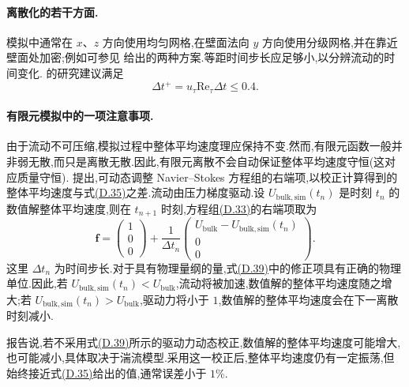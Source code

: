 \begin{example}[湍流槽道流]
\paragraph{离散化的若干方面.}
模拟中通常在 $x$、$z$ 方向使用均匀网格,在壁面法向 $y$ 方向使用分级网格,并在靠近壁面处加密;例如可参见\textcite{Gravemeier2006a,Gravemeier2006b} 给出的两种方案.等距时间步长应足够小,以分辨流动的时间变化.\textcite{ChoiMoin1994} 的研究建议满足
\begin{equation}\label{eq:appendix-d-38}
\Delta t^+=u_\tau\mathrm{Re}_\tau\Delta t\le0.4.
\end{equation}

\paragraph{有限元模拟中的一项注意事项.}
由于流动不可压缩,模拟过程中整体平均速度理应保持不变.然而,有限元函数一般并非弱无散,而只是离散无散.因此,有限元离散不会自动保证整体平均速度守恒(这对应质量守恒).\textcite{JohnRoland2007} 提出,可动态调整 Navier--Stokes 方程组的右端项,以校正计算得到的整体平均速度与式\hyperref[eq:appendix-d-35]{(D.35)}之差.流动由压力梯度驱动.设 $U_{\mathrm{bulk,sim}}(t_n)$ 是时刻 $t_n$ 的数值解整体平均速度,则在 $t_{n+1}$ 时刻,方程组\hyperref[eq:appendix-d-33]{(D.33)}的右端项取为
\begin{equation}\label{eq:appendix-d-39}
\bm f
=\begin{pmatrix}1\\0\\0\end{pmatrix}
+\frac{1}{\Delta t_n}
\begin{pmatrix}
U_{\mathrm{bulk}}-U_{\mathrm{bulk,sim}}(t_n)\\0\\0
\end{pmatrix}.
\end{equation}
这里 $\Delta t_n$ 为时间步长.对于具有物理量纲的量,式\hyperref[eq:appendix-d-39]{(D.39)}中的修正项具有正确的物理单位.因此,若 $U_{\mathrm{bulk,sim}}(t_n)<U_{\mathrm{bulk}}$,流动将被加速,数值解的整体平均速度随之增大;若 $U_{\mathrm{bulk,sim}}(t_n)>U_{\mathrm{bulk}}$,驱动力将小于 $1$,数值解的整体平均速度会在下一离散时刻减小.

\textcite{JohnRoland2007} 报告说,若不采用式\hyperref[eq:appendix-d-39]{(D.39)}所示的驱动力动态校正,数值解的整体平均速度可能增大,也可能减小,具体取决于湍流模型.采用这一校正后,整体平均速度仍有一定振荡,但始终接近式\hyperref[eq:appendix-d-35]{(D.35)}给出的值,通常误差小于 $1\%$.
\end{example}

